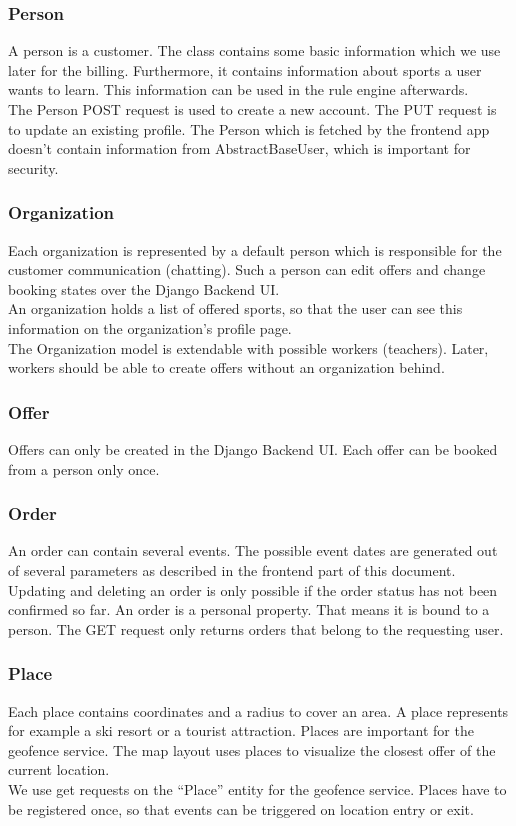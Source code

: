 \documentclass[11pt]{article} %
\begin{document}
\subsubsection{Person}
A person is a customer. The class contains some basic information which we use later for the billing. Furthermore, it contains information about sports a user wants to learn. This information can be used in the rule engine afterwards.\\
The Person POST request is used to create a new account. The PUT request is to update an existing profile. The Person which is fetched by the frontend app doesn’t contain information from AbstractBaseUser, which is important for security.

\subsubsection{Organization}
Each organization is represented by a default person which is responsible for the customer communication (chatting). Such a person can edit offers and change booking states over the Django Backend UI.\\
An organization holds a list of offered sports, so that the user can see this information on the organization's profile page.\\
The Organization model is extendable with possible workers (teachers). Later, workers should be able to create offers without an organization behind.

\subsubsection{Offer}
Offers can only be created in the Django Backend UI. Each offer can be booked from a person only once. 

\subsubsection{Order}
An order can contain several events. The possible event dates are generated out of several parameters as described in the frontend part of this document. \\
Updating and deleting an order is only possible if the order status has not been confirmed so far. An order is a personal property. That means it is bound to a person. The GET request only returns orders that belong to the requesting user.

\subsubsection{Place}
Each place contains coordinates and a radius to cover an area. A place represents for example a ski resort or a tourist attraction. Places are important for the geofence service. The map layout uses places to visualize the closest offer of the current location.\\
We use get requests on the “Place” entity for the geofence service. Places have to be registered once, so that events can be triggered on location entry or exit. 
\end{document}
